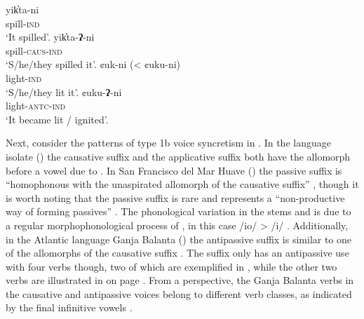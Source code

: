 \ea {} \citep[25, 337]{morgan:1991}
\ea\label{ex:Kutenai:spill:a}
	\gll	yik̓ta-ni \\
			spill-\textsc{ind} \\
	\glt	‘It spilled’.
\ex\label{ex:Kutenai:spill:b}
	\gll	yik̓ta-\textbf{ʔ}-ni \\
			spill-\textsc{caus-ind} \\
	\glt	‘S/he/they spilled it’.
\ex\label{ex:Kutenai:light:a}
	\gll	¢uk-ni (< ¢uku-ni) \\
			light-\textsc{ind} \\
	\glt	‘S/he/they lit it’.
\ex\label{ex:Kutenai:light:b}
	\gll	¢uku-\textbf{ʔ}-ni \\
			light-\textsc{antc-ind} \\
	\glt	‘It became lit / ignited’.
	\z
\z

Next, consider the patterns of type 1b voice syncretism in . In the language isolate  () the causative suffix  and the applicative suffix  both have the allomorph  before a vowel due to  \citep[46, 189]{steeman:2012}. In San Francisco del Mar Huave () the passive suffix  is “homophonous with the unaspirated allomorph of the causative suffix” , though it is worth noting that the passive suffix is rare and represents a “non-productive way of forming passives” \citep[305]{kim:2008}. The phonological variation in the stems  and  is due to a regular morphophonological process of , in this case /io/ > /i/ \citep[52ff.]{kim:2008}. Additionally, in the Atlantic language Ganja Balanta () the antipassive suffix  is similar to one of the allomorphs of the causative suffix . The suffix  only has an antipassive use with four verbs though, two of which are exemplified in , while the other two verbs are illustrated in  on page \pageref{tab:ch4:caus-antp-ganja}. From a  perspective, the Ganja Balanta verbs in the causative and antipassive voices belong to different verb classes, as indicated by the final infinitive vowels \citep[208ff.]{creissels:biaye:2016}.

